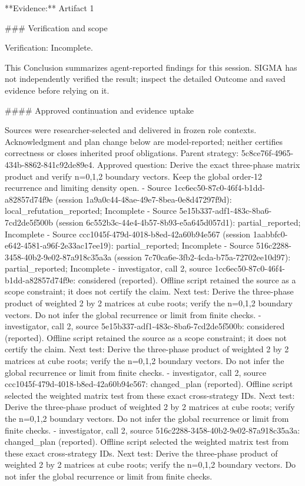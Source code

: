 \documentclass[11pt]{article}
\begin{document}
**Evidence:** Artifact 1

\#\#\# Verification and scope

Verification: Incomplete.

This Conclusion summarizes agent-reported findings for this session. SIGMA has not independently verified the result; inspect the detailed Outcome and saved evidence before relying on it.

\#\#\#\# Approved continuation and evidence uptake

Sources were researcher-selected and delivered in frozen role contexts. Acknowledgment and plan change below are model-reported; neither certifies correctness or closes inherited proof obligations.
Parent strategy: 5c8ce76f-4965-434b-8862-841c92de89e4. Approved question: Derive the exact three-phase matrix product and verify n=0,1,2 boundary vectors. Keep the global order-12 recurrence and limiting density open.
- Source 1cc6ec50-87c0-46f4-b1dd-a82857d74f9e (session 1a9a0c44-48ae-49e7-8bea-0e8d47297f9d): local\_refutation\_reported; Incomplete
- Source 5e15b337-adf1-483c-8ba6-7cd2de5f500b (session 6c552b3c-44e4-4b57-8b93-e5a645d057d1): partial\_reported; Incomplete
- Source ccc1045f-479d-4018-b8ed-42a60b94e567 (session 1aabbfc0-e642-4581-a96f-2e33ac17ee19): partial\_reported; Incomplete
- Source 516c2288-3458-40b2-9e02-87a918c35a3a (session 7c70ca6e-3fb2-4cda-b75a-72702ee10d97): partial\_reported; Incomplete
- investigator, call 2, source 1cc6ec50-87c0-46f4-b1dd-a82857d74f9e: considered (reported). Offline script retained the source as a scope constraint; it does not certify the claim. Next test: Derive the three-phase product of weighted 2 by 2 matrices at cube roots; verify the n=0,1,2 boundary vectors. Do not infer the global recurrence or limit from finite checks.
- investigator, call 2, source 5e15b337-adf1-483c-8ba6-7cd2de5f500b: considered (reported). Offline script retained the source as a scope constraint; it does not certify the claim. Next test: Derive the three-phase product of weighted 2 by 2 matrices at cube roots; verify the n=0,1,2 boundary vectors. Do not infer the global recurrence or limit from finite checks.
- investigator, call 2, source ccc1045f-479d-4018-b8ed-42a60b94e567: changed\_plan (reported). Offline script selected the weighted matrix test from these exact cross-strategy IDs. Next test: Derive the three-phase product of weighted 2 by 2 matrices at cube roots; verify the n=0,1,2 boundary vectors. Do not infer the global recurrence or limit from finite checks.
- investigator, call 2, source 516c2288-3458-40b2-9e02-87a918c35a3a: changed\_plan (reported). Offline script selected the weighted matrix test from these exact cross-strategy IDs. Next test: Derive the three-phase product of weighted 2 by 2 matrices at cube roots; verify the n=0,1,2 boundary vectors. Do not infer the global recurrence or limit from finite checks.
\end{document}
